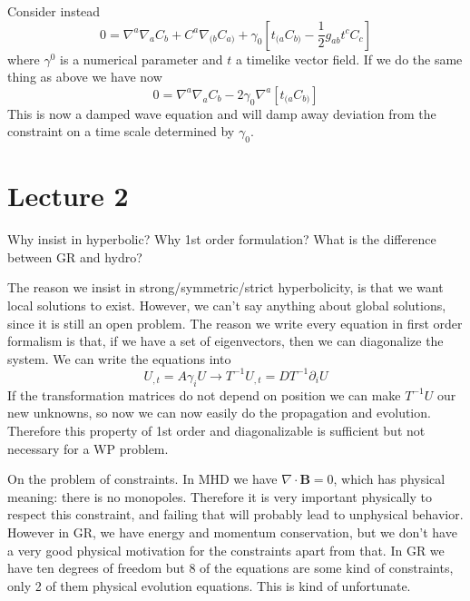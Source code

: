 \documentclass[letterpaper, 11pt]{article}
\numberwithin{equation}{section}
\numberwithin{figure}{section}
\begin{document}
Consider instead
\begin{equation}
  \label{eq:31}
  0 = \nabla^{a}\nabla_{a}C_{b} + C^{a}\nabla_{(b}C_{a)} + \gamma_0 \left[ t_{(a}C_{b)} - \frac{1}{2}g_{ab}t^{c}C_{c} \right]
\end{equation}
where $\gamma^0$ is a numerical parameter and $t$ a timelike vector field. If we
do the same thing as above we have now
\begin{equation}
  \label{eq:32}
  0 = \nabla^{a}\nabla_{a}C_{b} - 2\gamma_{0}\nabla^{a}\left[ t_{(a}C_{b)} \right]
\end{equation}
This is now a damped wave equation and will damp away deviation from the
constraint on a time scale determined by $\gamma_{0}$.

\section{Lecture 2}

Why insist in hyperbolic? Why 1st order formulation? What is the difference
between GR and hydro?

The reason we insist in strong/symmetric/strict hyperbolicity, is that we want
local solutions to exist. However, we can't say anything about global solutions,
since it is still an open problem. The reason we write every equation in first
order formalism is that, if we have a set of eigenvectors, then we can
diagonalize the system. We can write the equations into
\begin{equation}
  \label{eq:26}
  U_{,t} = A\gamma_iU \longrightarrow T^{-1}U_{,t} = D T^{-1}\partial_{i} U
\end{equation}
If the transformation matrices do not depend on position we can make $T^{-1}U$
our new unknowns, so now we can now easily do the propagation and evolution.
Therefore this property of 1st order and diagonalizable is sufficient but not
necessary for a WP problem.

On the problem of constraints. In MHD we have $\nabla\cdot \mathbf{B} = 0$,
which has physical meaning: there is no monopoles. Therefore it is very
important physically to respect this constraint, and failing that will probably
lead to unphysical behavior. However in GR, we have energy and momentum
conservation, but we don't have a very good physical motivation for the
constraints apart from that. In GR we have ten degrees of freedom but 8 of the
equations are some kind of constraints, only 2 of them physical evolution
equations. This is kind of unfortunate.
\end{document}
